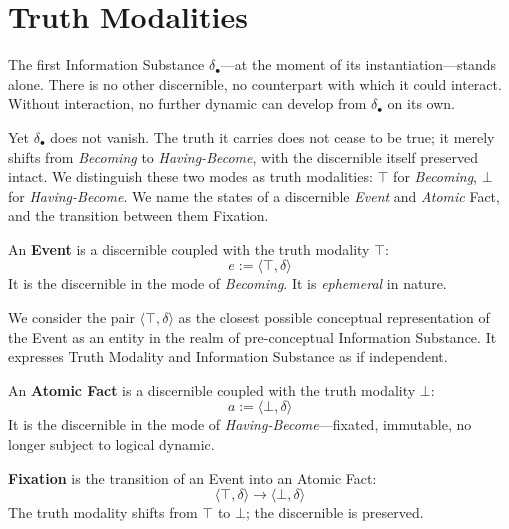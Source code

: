 \section{Truth Modalities}

The first Information Substance $\delta_\bullet$---at the moment of its
instantiation---stands alone. There is no other discernible, no counterpart
with which it could interact. Without interaction, no further dynamic can
develop from $\delta_\bullet$ on its own.

Yet $\delta_\bullet$ does not vanish. The truth it carries does not cease to be
true; it merely shifts from \textit{Becoming} to \textit{Having-Become}, with
the discernible itself preserved intact. We distinguish these two modes as
truth modalities: $\top$ for \textit{Becoming}, $\bot$ for
\textit{Having-Become}. We name the states of a discernible \textit{Event} and
\textit{Atomic} Fact, and the transition between them Fixation.

\begin{formalism}[Event]
    An \textbf{Event} is a discernible coupled with the truth modality $\top$:
    \begin{equation}
        e := \langle \top, \delta \rangle
    \end{equation}
    It is the discernible in the mode of \textit{Becoming}. It is
    \textit{ephemeral} in nature.
\end{formalism}

We consider the pair $\langle \top, \delta \rangle$ as the closest possible
conceptual representation of the Event as an entity in the realm of
pre-conceptual Information Substance. It expresses Truth Modality and
Information Substance as if independent.

\begin{formalism}
    An \textbf{Atomic Fact} is a discernible coupled with the truth modality
    $\bot$:
    \begin{equation}
        a := \langle \bot, \delta \rangle
    \end{equation}
    It is the discernible in the mode of \textit{Having-Become}---fixated,
    immutable, no longer subject to logical dynamic.
\end{formalism}

\begin{formalism}[Fixation]
    \textbf{Fixation} is the transition of an Event into an Atomic Fact:
    \begin{equation}
        \langle \top, \delta \rangle \rightarrow \langle \bot, \delta \rangle
    \end{equation}
    The truth modality shifts from $\top$ to $\bot$; the discernible is
    preserved.
\end{formalism}

